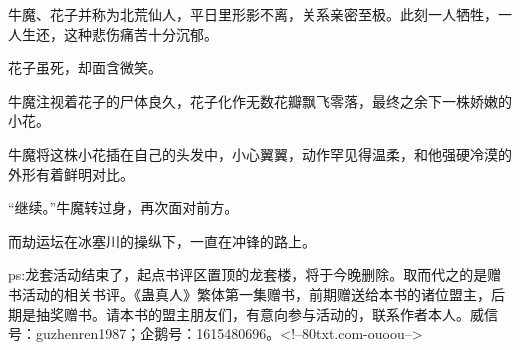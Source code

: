 \begin{this_body}
牛魔、花子并称为北荒仙人，平日里形影不离，关系亲密至极。此刻一人牺牲，一人生还，这种悲伤痛苦十分沉郁。

花子虽死，却面含微笑。

牛魔注视着花子的尸体良久，花子化作无数花瓣飘飞零落，最终之余下一株娇嫩的小花。

牛魔将这株小花插在自己的头发中，小心翼翼，动作罕见得温柔，和他强硬冷漠的外形有着鲜明对比。

“继续。”牛魔转过身，再次面对前方。

而劫运坛在冰塞川的操纵下，一直在冲锋的路上。

ps:龙套活动结束了，起点书评区置顶的龙套楼，将于今晚删除。取而代之的是赠书活动的相关书评。《蛊真人》繁体第一集赠书，前期赠送给本书的诸位盟主，后期是抽奖赠书。请本书的盟主朋友们，有意向参与活动的，联系作者本人。威信号：guzhenren1987；企鹅号：1615480696。<!--80txt.com-ouoou-->

\end{this_body}

